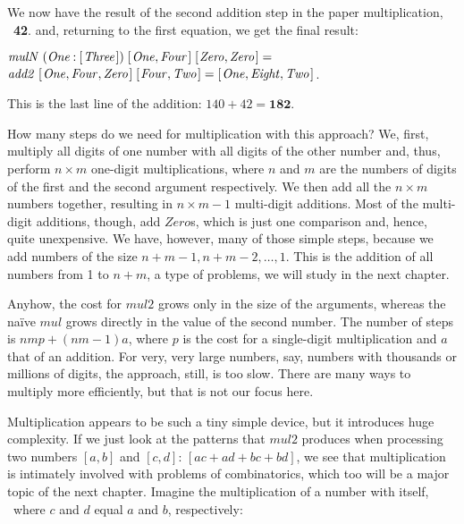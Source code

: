 \documentclass{scrreprt}
\newcommand{\Conid}[1]{\mathit{#1}}
\newcommand{\Varid}[1]{\mathit{#1}}
\begin{document}
We now have the result of the second addition step
in the paper multiplication, \ie\ \textbf{42}.
and, returning to the first equation, 
we get the final result:

\begin{minipage}{\textwidth}
\ensuremath{\Varid{mulN}\;(\Conid{One}\mathbin{:}[\mskip1.5mu \Conid{Three}\mskip1.5mu])\;[\mskip1.5mu \Conid{One},\Conid{Four}\mskip1.5mu]\;[\mskip1.5mu \Conid{Zero},\Conid{Zero}\mskip1.5mu]\mathrel{=}}\\ 
\ensuremath{\Varid{add2}\;[\mskip1.5mu \Conid{One},\Conid{Four},\Conid{Zero}\mskip1.5mu]\;[\mskip1.5mu \Conid{Four},\Conid{Two}\mskip1.5mu]\mathrel{=}[\mskip1.5mu \Conid{One},\Conid{Eight},\Conid{Two}\mskip1.5mu]}.
\end{minipage}

This is the last line of the addition:
$140 + 42 = \mathbf{182}$.

How many steps do we need for multiplication
with this approach?
We, first, multiply all digits of one number
with all digits of the other number and,
thus, perform $n \times m$ one-digit multiplications,
where $n$ and $m$ are the numbers of digits of the first
and the second argument respectively.
We then add all the $n \times m$ numbers together,
resulting in $n \times m - 1$
multi-digit additions.
Most of the multi-digit additions, though,
add \ensuremath{\Conid{Zero}}s, which is just one comparison
and, hence, quite unexpensive.
We have, however, many of those simple steps,
because we add numbers of the size
$n + m - 1, n + m - 2, \dots, 1$. 
This is the addition
of all numbers from 1 to $n + m$,
a type of problems,
we will study in the next chapter. 

Anyhow, the cost for \ensuremath{\Varid{mul2}} grows only 
in the size of the arguments,
whereas the na\"ive \ensuremath{\Varid{mul}} grows
directly in the value of the second number.
The number of steps is $nmp + (nm-1)a$,
where $p$ is the cost for a single-digit
multiplication and $a$ that of an addition. 
For very, very large numbers,
say, numbers with thousands or millions of digits,
the approach, still, is too slow.
There are many ways to multiply more efficiently,
but that is not our focus here.

Multiplication appears to be such a tiny simple device,
but it introduces huge complexity.
If we just look at the patterns
that \ensuremath{\Varid{mul2}} produces when processing
two numbers $[a,b]$ and $[c,d]$:
$[ac + ad + bc + bd]$,
we see that multiplication is intimately
involved with problems of combinatorics,
which too will be a major topic
of the next chapter.
Imagine the multiplication of a number
with itself, \ie\ where $c$ and $d$ 
equal $a$ and $b$, respectively:
\end{document}
